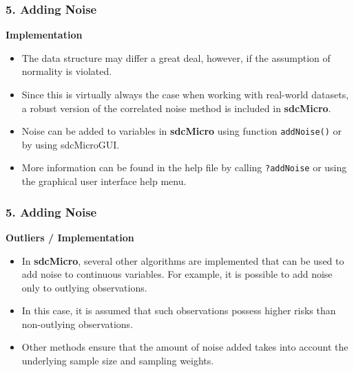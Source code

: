 \documentclass{beamer}
\begin{document}
\begin{frame}
	\frametitle{5. Adding Noise}
	\textbf{Implementation}
	\begin{itemize}
\item The data structure may differ a great deal,
however, if the assumption of normality is violated. 
\item Since this is virtually always
the case when working with real-world datasets, a robust version of the correlated
noise method is included in \textbf{sdcMicro}. 
\item Noise can be added to variables in \textbf{sdcMicro} using function \texttt{addNoise()} or by
using sdcMicroGUI.
\item More information can be found in the help ﬁle by calling \texttt{?addNoise} or using the graphical
user interface help menu.
\end{itemize}
\end{frame}
\begin{frame}
	\frametitle{5. Adding Noise}
	\textbf{Outliers / Implementation}
	\begin{itemize}
\item In \textbf{sdcMicro}, several other algorithms are implemented that can be used to add
noise to continuous variables. For example, it is possible to add noise only to outlying observations. 
\item In this case, it is assumed that such observations possess higher risks than non-outlying observations.

 
\item Other methods ensure that the amount of
noise added takes into account the underlying sample size and sampling weights.

\end{itemize}
\end{frame}
\end{document}

